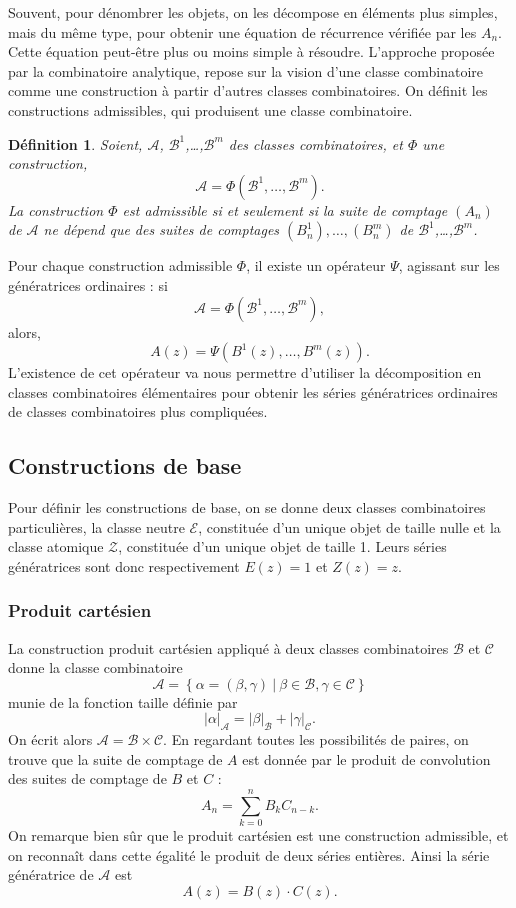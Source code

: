 \documentclass[12pt]{article}
\newtheorem*{definition}{Définition}
\begin{document}
Souvent, pour dénombrer les objets, on les décompose en éléments plus simples, mais du même type, pour obtenir une équation de récurrence vérifiée par les $A_n$. Cette équation peut-être plus ou moins simple à résoudre.
L'approche proposée par la combinatoire analytique, repose sur la vision d'une classe combinatoire comme une construction à partir d'autres classes combinatoires. 
On définit les  constructions admissibles, qui produisent une classe combinatoire. 
\begin{definition}Soient, $\mathcal A$, $\mathcal B^{1}$,\dots,$\mathcal B^{m}$ des classes combinatoires, et $\Phi$ une construction, 
$$\mathcal A = \Phi(\mathcal B^{1},\dots,\mathcal B^{m}).$$
La construction $\Phi$ est admissible si et seulement si la suite de comptage $(A_n)$  de $\mathcal A$ ne dépend que des suites de comptages $(B_n^{1}),\dots, (B_n^{m})$ de $\mathcal B^{1}$,\dots,$\mathcal B^{m}$.
\end{definition}
Pour chaque construction admissible $\Phi$, il existe un opérateur $\Psi$, agissant sur les génératrices ordinaires : si
$$\mathcal A = \Phi(\mathcal B^{1},\dots,\mathcal B^{m}),$$
alors, 
$$A(z) = \Psi(B^1(z),\dots, B^m(z)).$$
L'existence de cet opérateur va nous permettre d'utiliser la décomposition en classes combinatoires élémentaires pour obtenir les séries génératrices ordinaires de classes combinatoires plus compliquées.
\subsection{Constructions de base}
Pour définir les constructions de base, on se donne deux classes combinatoires particulières, la classe neutre $\mathcal E$, constituée d'un unique objet de taille nulle et la classe atomique $\mathcal Z$, constituée d'un unique objet de taille 1.
Leurs séries génératrices sont donc respectivement $E(z)=1$ et $Z(z)=z$.

\subsubsection*{Produit cartésien}
La construction produit cartésien appliqué à deux classes combinatoires $\mathcal B$ et $\mathcal C$ donne la classe combinatoire 
$$\mathcal A = \left\{\alpha =(\beta,\gamma)\ |\ \beta \in \mathcal B, \gamma \in\mathcal C\right\}$$
munie de la fonction taille définie par 
$$|\alpha|_{\mathcal A} = |\beta|_{\mathcal B} +|\gamma|_{\mathcal C}.$$
On écrit alors $\mathcal A = \mathcal B \times \mathcal C$.
En regardant toutes les possibilités de paires, on trouve que la suite de comptage de $A$ est donnée par le produit de convolution des suites de comptage de $B$ et $C$ :
$$A_n = \sum_{k=0}^n B_k C_{n-k}.$$
On remarque bien sûr que le produit cartésien est une construction admissible, et on reconnaît dans cette égalité le produit de deux séries entières. Ainsi la série génératrice de $\mathcal A$ est 
$$A(z) = B(z)\cdot C(z).$$
\end{document}
